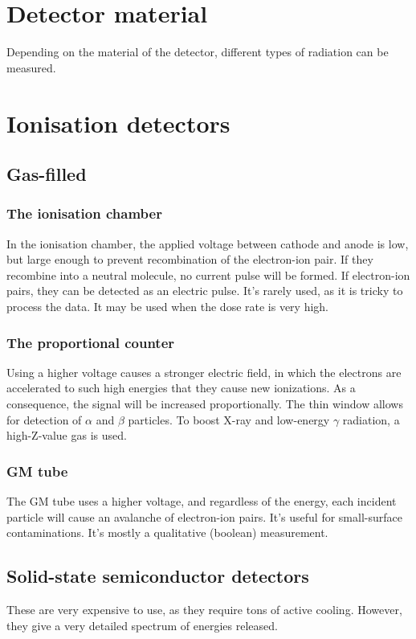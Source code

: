 \section{Detector material}
Depending on the material of the detector, different types of radiation can be measured.
\section{Ionisation detectors}
\subsection{Gas-filled}
\subsubsection{The ionisation chamber}
In the ionisation chamber, the applied voltage between cathode and anode is low, but large enough to prevent recombination of the electron-ion pair. If they recombine into a neutral molecule, no current pulse will be formed. If electron-ion pairs, they can be detected as an electric pulse. It's rarely used, as it is tricky to process the data. It may be used when the dose rate is very high.
\subsubsection{The proportional counter}
Using a higher voltage causes a stronger electric field, in which the electrons are accelerated to such high energies that they cause new ionizations. As a consequence, the signal will be increased proportionally. The thin window allows for detection of $\alpha$ and $\beta$ particles. To boost X-ray and low-energy $\gamma$ radiation, a high-Z-value gas is used.
\subsubsection{GM tube}
The GM tube uses a higher voltage, and regardless of the energy, each incident particle will cause an avalanche of electron-ion pairs. It's useful for small-surface contaminations. It's mostly a qualitative (boolean) measurement.
\subsection{Solid-state semiconductor detectors}
These are very expensive to use, as they require tons of active cooling. However, they give a very detailed spectrum of energies released.
